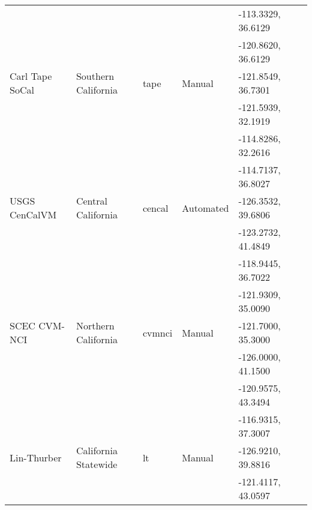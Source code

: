 \begin{table*}
\begin{tabular}[]{llllll}
                   &                       &               &              & -113.3329, 36.6129 & \citet{CVM-H_Manual}         \\
                   &                       &               &              & -120.8620, 36.6129 &                              \\ 
Carl Tape SoCal    & Southern California   & tape          &  Manual      & -121.8549, 36.7301 & \citet{Tape_2010_GJI}        \\
                   &                       &               &              & -121.5939, 32.1919 &                              \\
                   &                       &               &              & -114.8286, 32.2616 &                              \\
                   &                       &               &              & -114.7137, 36.8027 &                              \\
USGS CenCalVM      & Central California    & cencal        &  Automated   & -126.3532, 39.6806 & \citet{Brocher_2005_Tech}    \\
                   &                       &               &              & -123.2732, 41.4849 & \citet{Brocher_2006_Proc}    \\
                   &                       &               &              & -118.9445, 36.7022 &                              \\
                   &                       &               &              & -121.9309, 35.0090 &                              \\
SCEC CVM-NCI       & Northern California   & cvmnci        &  Manual      & -121.7000, 35.3000 & \citet{Xu_2013_PAG}          \\
                   &                       &               &              & -126.0000, 41.1500 &                              \\
                   &                       &               &              & -120.9575, 43.3494 &                              \\
                   &                       &               &              & -116.9315, 37.3007 &                              \\
Lin-Thurber        & California Statewide  & lt            &  Manual      & -126.9210, 39.8816 & \citet{Lin_2010_BSSA}        \\
                   &                       &               &              & -121.4117, 43.0597 &                              \\

\end{tabular}
\end{table*}

